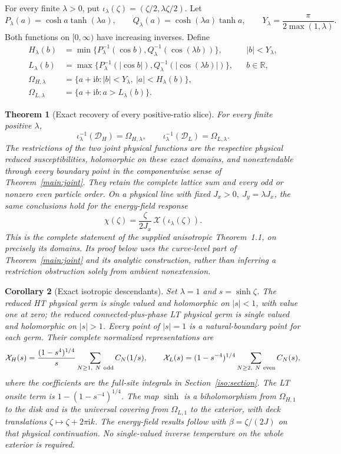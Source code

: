 \documentclass[11pt]{article}
\numberwithin{equation}{section}
\newtheorem{theorem}{Theorem}[section]
\newtheorem{corollary}[theorem]{Corollary}
\theoremstyle{definition}
\newcommand{\R}{\mathbb R}
\newcommand{\ii}{\mathrm i}
\renewcommand{\DH}{\mathcal D_H}
\newcommand{\DL}{\mathcal D_L}
\newcommand{\XH}{\mathcal X_H}
\newcommand{\XL}{\mathcal X_L}
\begin{document}
For every finite \(\lambda>0\), put
\(\iota_\lambda(\zeta)=(\zeta/2,\lambda\zeta/2)\). Let
\[
 P_\lambda(a)=\cosh a\tanh(\lambda a),\qquad
 Q_\lambda(a)=\cosh(\lambda a)\tanh a,\qquad
 Y_\lambda=\frac{\pi}{2\max(1,\lambda)}.
\]
Both functions on \([0,\infty)\) have increasing inverses. Define
\begin{align*}
 H_\lambda(b)&=\min\{P_\lambda^{-1}(\cos b),
                      Q_\lambda^{-1}(\cos(\lambda b))\},
                 &&|b|<Y_\lambda,\\
 L_\lambda(b)&=\max\{P_\lambda^{-1}(|\cos b|),
                      Q_\lambda^{-1}(|\cos(\lambda b)|)\},
                 &&b\in\R,\\
 \Omega_{H,\lambda}&=\{a+\ii b:|b|<Y_\lambda,\ |a|<H_\lambda(b)\},\\
 \Omega_{L,\lambda}&=\{a+\ii b:a>L_\lambda(b)\}.
\end{align*}

\begin{theorem}[Exact recovery of every positive-ratio slice]
\label{main:slices}
For every finite positive \(\lambda\),
\[
 \iota_\lambda^{-1}(\DH)=\Omega_{H,\lambda},\qquad
 \iota_\lambda^{-1}(\DL)=\Omega_{L,\lambda}.
\]
The restrictions of the two joint physical functions are the respective
physical reduced susceptibilities, holomorphic on these exact domains,
and nonextendable through every boundary point in the componentwise
sense of Theorem~\ref{main:joint}. They retain the complete lattice
sum and every odd or nonzero even particle order. On a physical line
with fixed \(J_x>0,\ J_y=\lambda J_x\), the same conclusions hold
for the energy-field response
\[
       \chi(\zeta)=\frac{\zeta}{2J_x}\,
                         \mathcal X(\iota_\lambda(\zeta)).
\]
This is the complete statement of the supplied anisotropic
Theorem~1.1, on precisely its domains. Its proof below uses the
curve-level part of Theorem~\ref{main:joint} and its analytic
construction, rather than inferring a restriction obstruction solely
from ambient nonextension.
\end{theorem}

\begin{corollary}[Exact isotropic descendants]\label{main:isotropic}
Set \(\lambda=1\) and \(s=\sinh\zeta\).
The reduced HT physical germ is single valued and holomorphic on
\(|s|<1\), with value one at zero; the reduced connected-plus-phase
LT physical germ is single valued and holomorphic on \(|s|>1\).
Every point of \(|s|=1\) is a natural-boundary point for each germ.
Their complete normalized representations are
\[
 \XH(s)=\frac{(1-s^4)^{1/4}}{s}
                      \sum_{N\ge1,\ N\ {\rm odd}}C_N(1/s),\qquad
 \XL(s)=(1-s^{-4})^{1/4}
                      \sum_{N\ge2,\ N\ {\rm even}}C_N(s),
\]
where the coefficients are the full-site integrals in
Section~\ref{iso:section}. The LT onsite term is
\(1-(1-s^{-4})^{1/4}\).
The map \(\sinh\) is a biholomorphism from \(\Omega_{H,1}\)
to the disk and is the universal covering from \(\Omega_{L,1}\)
to the exterior, with deck translations \(\zeta\mapsto\zeta+2\pi\ii k\).
The energy-field results follow with \(\beta=\zeta/(2J)\) on that
physical continuation. No single-valued inverse temperature on the
whole exterior is required.
\end{corollary}
\end{document}
